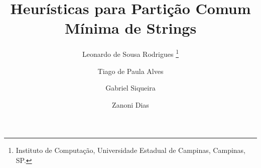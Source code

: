 \documentclass[11pt,twoside]{article}
\begin{document}




    \TRMakeCover


    \pagestyle{myheadings}

    \title{Heurísticas para Partição Comum Mínima de Strings}

    \author{
        Leonardo de Sousa Rodrigues%
        \thanks{Instituto de Computação, Universidade Estadual de Campinas, Campinas, SP.}
        \and
        Tiago de Paula Alves\footnotemark[1]
        \and
        Gabriel Siqueira\footnotemark[1]
        \and
        Zanoni Dias\footnotemark[1]
    }

    \date{}

    \maketitle
\end{document}
